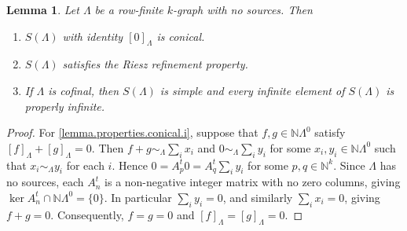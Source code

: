 \documentclass[a4paper, 12pt]{amsart}
\numberwithin{equation}{section}
\newcounter{theorem}
\newtheorem{lemma}[theorem]{Lemma}
\theoremstyle{remark}
\theoremstyle{definition}
\begin{document}
\begin{lemma}\label{lemma.properties.conical}
Let $\Lambda$ be a row-finite $k$-graph with no sources.  Then
\begin{enumerate}
\item\label{lemma.properties.conical.i} $S(\Lambda)$ with identity ${{[{0}]_\Lambda}}$ is conical.
\item\label{lemma.properties.conical.ii} $S(\Lambda)$ satisfies the Riesz refinement property.
\item\label{lemma.properties.conical.iii} If $\Lambda$ is cofinal, then $S(\Lambda)$ is simple and every infinite
    element of $S(\Lambda)$ is properly infinite.
\end{enumerate}
\end{lemma}
\begin{proof}
For \eqref{lemma.properties.conical.i}, suppose that $f,g\in {\mathbb{N}}\Lambda^0$ satisfy ${{[{f}]_\Lambda}}+{{[{g}]_\Lambda}}=0$. Then
$f+g\sim_\Lambda \sum_ix_i$ and $0\sim_\Lambda \sum_iy_i$ for some $x_i, y_i\in
{\mathbb{N}}\Lambda^0$ such that $x_i\sim_\Lambda y_i$ for each $i$. Hence $0=A^t_p0=A^t_q\sum_iy_i$
for some $p,q\in {\mathbb{N}}^k$. Since $\Lambda$ has no sources, each $A^t_n$ is a non-negative
integer matrix with no zero columns, giving $\ker A^t_n\cap {\mathbb{N}} \Lambda^0 = \{0\}$. In
particular $\sum_iy_i=0$, and similarly $\sum_ix_i=0$, giving $f+g=0$. Consequently, $f=g=0$ and
${{[{f}]_\Lambda}}={{[{g}]_\Lambda}}=0$.


\end{proof}
\end{document}
